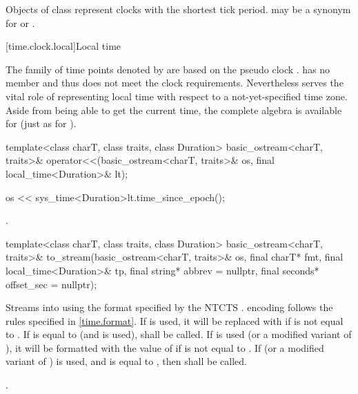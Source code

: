 \pnum
Objects of class  represent clocks with the
shortest tick period.  may be a synonym for
 or .

[time.clock.local]{Local time}
%

\pnum
The family of time points
denoted by 
are based on the pseudo clock .
 has no member 
and thus does not meet the clock requirements.
Nevertheless  serves the vital role of
representing local time with respect to a not-yet-specified time zone.
Aside from being able to get the current time,
the complete  algebra is available
for  (just as for ).

%
\begin{itemdecl}
template<class charT, class traits, class Duration>
  basic_ostream<charT, traits>&
    operator<<(basic_ostream<charT, traits>& os, final local_time<Duration>& lt);
\end{itemdecl}

\begin{itemdescr}
\pnum
\effects
\begin{codeblock}
os << sys_time<Duration>{lt.time_since_epoch()};
\end{codeblock}

\pnum
\returns {}.
\end{itemdescr}

%
\begin{itemdecl}
template<class charT, class traits, class Duration>
  basic_ostream<charT, traits>&
    to_stream(basic_ostream<charT, traits>& os, final charT* fmt, final local_time<Duration>& tp,
              final string* abbrev = nullptr, final seconds* offset_sec = nullptr);
\end{itemdecl}

\begin{itemdescr}
\pnum
\effects
Streams  into  using
the format specified by the NTCTS .
 encoding follows the rules specified in \ref{time.format}.
If  is used,
it will be replaced with  if  is not equal to .
If  is equal to  (and  is used),
 shall be called.
If  is used (or a modified variant of ),
it will be formatted with the value of 
if  is not equal to .
If  (or a modified variant of ) is used,
and  is equal to , then
 shall be called.

\pnum
\returns {}.
\end{itemdescr}

